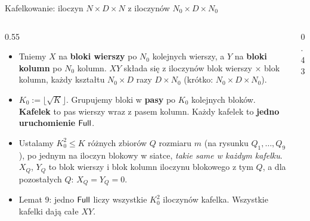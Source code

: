 \begin{frame}{Kafelkowanie: iloczyn $N\times D\times N$ z iloczynów $N_0\times D\times N_0$}
  \begin{columns}[T]
    \begin{column}{0.55\textwidth}
      \footnotesize
      \begin{itemize}
        \item Tniemy $X$ na \textbf{bloki wierszy} po $N_0$ kolejnych wierszy, a $Y$ na \textbf{bloki kolumn} po $N_0$ kolumn.
          $XY$ składa się z iloczynów blok wierszy $\times$ blok kolumn, każdy kształtu $N_0\times D$ razy $D\times N_0$ (krótko: $N_0\times D\times N_0$).
        \item<2-> $K_0:=\lfloor\sqrt K\rfloor$. Grupujemy bloki w \textbf{pasy} po $K_0$ kolejnych bloków.
          \textbf{Kafelek} to pas wierszy wraz z pasem kolumn. Każdy kafelek to \textbf{jedno uruchomienie $\mathsf{Full}$}.
        \item<3-> Ustalamy $K_0^2\le K$ różnych zbiorów $Q$ rozmiaru $m$ (na rysunku $Q_1,\dots,Q_9$), po jednym na iloczyn blokowy w siatce,
          \emph{takie same w każdym kafelku}. $X_Q$, $Y_Q$ to blok wierszy i blok kolumn iloczynu blokowego z tym $Q$,
          a dla pozostałych $Q$: $X_Q=Y_Q=0$.
        \item<4-> Lemat 9: jedno $\mathsf{Full}$ liczy wszystkie $K_0^2$ iloczynów kafelka. Wszystkie kafelki dają całe $XY$.
      \end{itemize}
    \end{column}
    \begin{column}{0.43\textwidth}
      \centering
\end{column}
\end{columns}
\end{frame}
